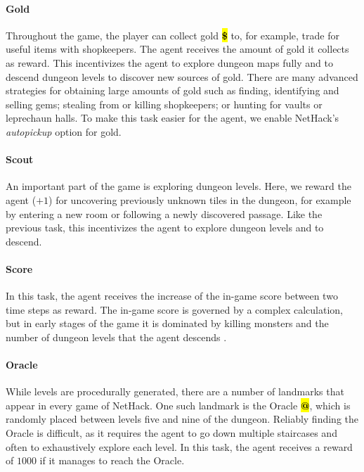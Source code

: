 \documentclass{article}
\makeatletter
\newcommand{\nethack}{NetHack}
\newcommand{\Oracle}{{\bf\ttfamily\color{nethack_light_blue}\sethlcolor{black}\hl{@}}}
\newcommand{\Gold}{{\bf\ttfamily\color{nethack_light_yellow}\sethlcolor{black}\hl{\$}}}
\makeatother
\begin{document}
\paragraph{Gold}
Throughout the game, the player can collect gold \Gold{} to, for example, trade for
useful items with shopkeepers.  The agent receives the amount of gold
it collects as reward.  This incentivizes the agent to explore dungeon
maps fully and to descend dungeon levels to discover new sources of
gold.  There are many advanced strategies for obtaining large amounts
of gold such as finding, identifying and selling gems; stealing from
or killing shopkeepers; or hunting for vaults or leprechaun halls.
To make this task easier for the agent, we enable \nethack{}'s
\emph{autopickup} option for gold.

\paragraph{Scout}
An important part of the game is exploring dungeon levels. Here, we
reward the agent ($+1$) for uncovering previously unknown tiles in the
dungeon, for example by entering a new room or following a newly
discovered passage.  Like the previous task, this incentivizes the
agent to explore dungeon levels and to descend.

\paragraph{Score}
In this task, the agent receives the increase of the in-game
score between two time steps as reward.
The in-game score is governed by a complex calculation, but in
early stages of the game it is dominated by killing monsters and the number of
dungeon levels that the agent descends \citep[see][``Score'' entry for
  details]{nhwiki}.

\paragraph{Oracle}
While levels are procedurally generated, there are a number of
landmarks that appear in every game of \nethack{}.  One such landmark
is the Oracle \Oracle{}, which is randomly placed between levels five and nine
of the dungeon.  Reliably finding the Oracle is difficult, as it
requires the agent to go down multiple staircases and often to
exhaustively explore each level.  In this task, the agent receives a
reward of $1000$ if it manages to reach the Oracle.
\end{document}
